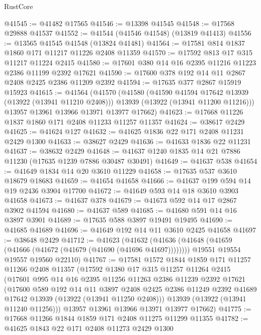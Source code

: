 \begin{lexlean}{RustCore}
\begin{coremodule}
@41545 := @41482 @17565
@41546 := @13398 @41545
@41548 := @17568 @29888 @41537
@41552 := @41544 (@41546 @41548) (@13819 @41413)
@41556 := @13565 @41545 @41548 (@13824 @41481)
@41564 := @17581 @814 @1837 @1860 @171 @11217 @11226 @2408 @11359
@41570 := @17592 @813 @17 @315 @11217 @11224 @2415
@41580 := @17601 @380 @14 @16 @2395 @11216 @11223 @2386 @11199 @2392 @17621
@41590 := @17600 @378 @192 @14 @11 @2867 @2408 @2425 @2386 @11209 @2392
@41594 := @17635 @377 @2867 @15919 @15923
@41615 := @41564
    (@41570
      (@41580
        (@41590 @41594 @17642 @13939 (@13922 (@13941 @11210 @2408)))
        @13939
        (@13922 (@13941 @11200 @11216)))
      @13957
      @13961
      @13966
      @13971
      @13977
      @17662)
@41623 := @17668 @11226 @1837 @1860 @171 @2408 @11233 @11257 @11357
@41624 := @38617 @2429
@41625 := @41624 @127
@41632 := @41625 @1836 @22 @171 @2408 @11231 @2429 @1300
@41633 := @38627 @2429
@41636 := @41633 @1836 @22 @11231
@41637 := @38632 @2429
@41648 := @41637 @1240 @1835 @14 @21 @7886 @11230 (@17635 @1239 @7886 @30487 @30491)
@41649 := @41637 @538
@41654 := @41649 @1834 @14 @20 @3610 @11229
@41658 := @17635 @537 @3610 @18679 @18683
@41659 := @41654 @41658
@41666 := @41637 @199 @594 @14 @19 @2436 @3904 @17700
@41672 := @41649 @593 @14 @18 @3610 @3903 @41658
@41673 := @41637 @378
@41679 := @41673 @592 @14 @17 @2867 @3902 @41594
@41680 := @41637 @589
@41685 := @41680 @591 @14 @16 @3897 @3901
@41689 := @17635 @588 @3897 @19491 @19495
@41690 := @41685 @41689
@41696 := @41649 @192 @14 @11 @3610 @2425 @41658
@41697 := @38648 @2429
@41712 := @41623
    (@41632
      (@41636 (@41648 (@41659 (@41666 (@41672 (@41679 (@41690 (@41696 @41697))))))))
      @19551
      @19554
      @19557
      @19560
      @22110)
@41767 := @17581
    @1572
    @1844
    @1859
    @171
    @11257
    @11266
    @2408
    @11357
    (@17592
      @1380
      @17
      @315
      @11257
      @11264
      @2415
      (@17601
        @995
        @14
        @16
        @2395
        @11256
        @11263
        @2386
        @11239
        @2392
        @17621
        (@17600
          @589
          @192
          @14
          @11
          @3897
          @2408
          @2425
          @2386
          @11249
          @2392
          @41689
          @17642
          @13939
          (@13922 (@13941 @11250 @2408)))
        @13939
        (@13922 (@13941 @11240 @11256)))
      @13957
      @13961
      @13966
      @13971
      @13977
      @17662)
@41775 := @17668 @11266 @1844 @1859 @171 @2408 @11275 @11299 @11355
@41782 := @41625 @1843 @22 @171 @2408 @11273 @2429 @1300

\end{coremodule}
\end{lexlean}
